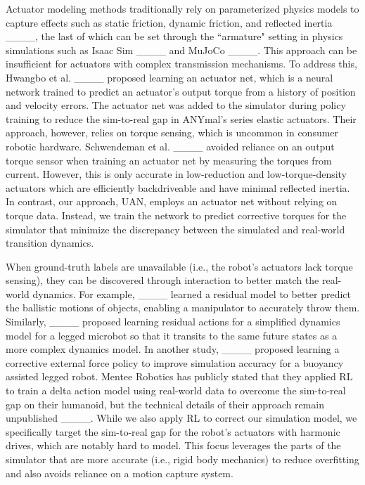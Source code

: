 Actuator modeling methods traditionally rely on parameterized physics models to capture effects such as static friction, dynamic friction, and reflected inertia ____, the last of which can be set through the ``armature" setting in physics simulations such as Isaac Sim ____ and MuJoCo ____. This approach can be insufficient for actuators with complex transmission mechanisms. To address this, Hwangbo et al. ____ proposed learning an actuator net, which is a neural network trained to predict an actuator's output torque from a history of position and velocity errors. The actuator net was added to the simulator during policy training to reduce the sim-to-real gap in ANYmal's series elastic actuators. Their approach, however, relies on torque sensing, which is uncommon in consumer robotic hardware. Schwendeman et al. ____ avoided reliance on an output torque sensor when training an actuator net by measuring the torques from current. However, this is only accurate in low-reduction and low-torque-density actuators which are efficiently backdriveable and have minimal reflected inertia. In contrast, our approach, UAN, employs an actuator net without relying on torque data. Instead, we train the network to predict corrective torques for the simulator that minimize the discrepancy between the simulated and real-world transition dynamics. 

When ground-truth labels are unavailable (i.e., the robot's actuators lack torque sensing), 
they can be discovered through interaction
to better match the real-world dynamics.
For example, ____ learned a residual model to better predict the ballistic motions of objects, enabling a manipulator to accurately throw them.
Similarly, ____ proposed learning residual actions for a simplified dynamics model for a legged microbot so that it transits to the same future states as a more complex dynamics model. In another study, ____ proposed learning a corrective external force policy to improve simulation accuracy for a buoyancy assisted legged robot.
Mentee Robotics has publicly stated that they applied RL to train a delta action model using real-world data
to overcome the sim-to-real gap on their humanoid, 
but the technical details of their approach remain unpublished
____. While we also apply RL to correct our simulation model, we specifically target the sim-to-real gap for the robot's actuators with harmonic drives, which are notably hard to model. This focus leverages the parts of the simulator that are more accurate (i.e., rigid body mechanics) to reduce overfitting and also avoids reliance on a motion capture system.
